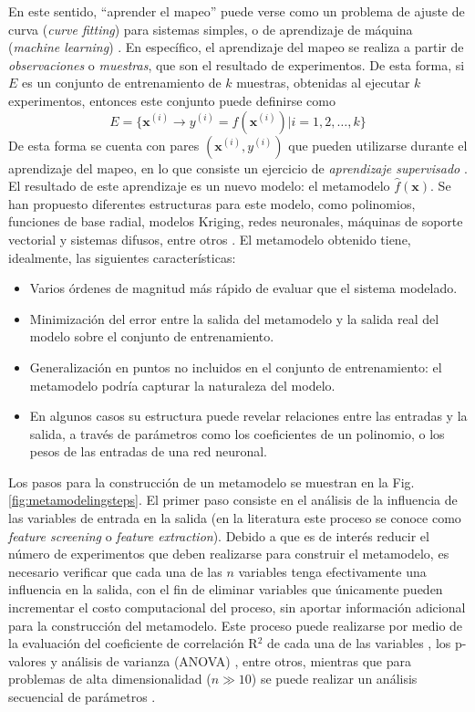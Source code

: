 En este sentido, ``aprender el mapeo'' puede verse como un problema de ajuste de curva (\textit{curve fitting}) para sistemas simples, o de aprendizaje de máquina (\textit{machine learning}) \cite{forrester2008}. En específico, el aprendizaje del mapeo se realiza a partir de \textit{observaciones} o \textit{muestras}, que son el resultado de experimentos. De esta forma, si $E$ es un conjunto de entrenamiento de $k$ muestras, obtenidas al ejecutar $k$ experimentos, entonces este conjunto puede definirse como
\begin{equation*}
E = \lbrace \mathbf{x}^{(i)}\rightarrow y^{(i)}=f(\mathbf{x}^{(i)})|i=1,2,\ldots,k \rbrace
\end{equation*}
De esta forma se cuenta con pares $(\mathbf{x}^{(i)},y^{(i)})$ que pueden utilizarse durante el aprendizaje del mapeo, en lo que consiste un ejercicio de \textit{aprendizaje supervisado} \cite{hastie2008}. El resultado de este aprendizaje es un nuevo modelo: el metamodelo $\hat{f}(\mathbf{x})$. Se han propuesto diferentes estructuras para este modelo, como polinomios, funciones de base radial, modelos Kriging, redes neuronales, máquinas de soporte vectorial y sistemas difusos, entre otros \cite{forrester2008,tenne2010}. El metamodelo obtenido tiene, idealmente, las siguientes características:
\begin{itemize}
\item Varios órdenes de magnitud más rápido de evaluar que el sistema modelado.
\item Minimización del error entre la salida del metamodelo y la salida real del modelo sobre el conjunto de entrenamiento.
\item Generalización en puntos no incluidos en el conjunto de entrenamiento: el metamodelo podría capturar la naturaleza del modelo.
\item En algunos casos su estructura puede revelar relaciones entre las entradas y la salida, a través de parámetros como los coeficientes de un polinomio, o los pesos de las entradas de una red neuronal.
\end{itemize}

Los pasos para la construcción de un metamodelo se muestran en la Fig. \ref{fig:metamodelingsteps}. El primer paso consiste en el análisis de la influencia de las variables de entrada en la salida (en la literatura este proceso se conoce como \textit{feature screening} o \textit{feature extraction}). Debido a que es de interés reducir el número de experimentos que deben realizarse para construir el metamodelo, es necesario verificar que cada una de las $n$ variables tenga efectivamente una influencia en la salida, con el fin de eliminar variables que únicamente pueden incrementar el costo computacional del proceso, sin aportar información adicional para la construcción del metamodelo. Este proceso puede realizarse por medio de la evaluación del coeficiente de correlación R$^2$ de cada una de las variables \cite{giurgea2007}, los p-valores \cite{meng2010} y análisis de varianza (ANOVA) \cite{gillon2010}, entre otros, mientras que para problemas de alta dimensionalidad ($n \gg 10$) se puede realizar un análisis secuencial de parámetros \cite{silva2015}.


